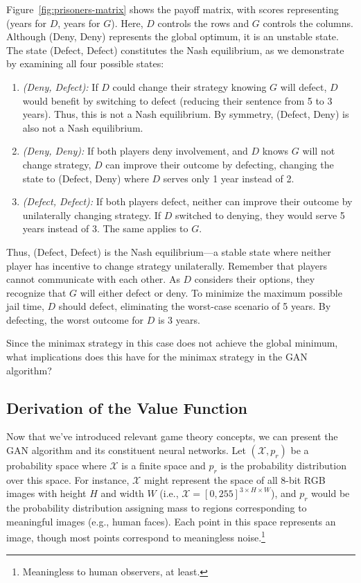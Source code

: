 Figure~\ref{fig:prisoners-matrix} shows the payoff matrix, with scores representing (years for $D$, years for $G$). Here, $D$ controls the rows and $G$ controls the columns. Although (Deny, Deny) represents the global optimum, it is an unstable state. The state (Defect, Defect) constitutes the Nash equilibrium, as we demonstrate by examining all four possible states:

\begin{enumerate}
	\item \textit{(Deny, Defect):} If $D$ could change their strategy knowing $G$ will defect, $D$ would benefit by switching to defect (reducing their sentence from 5 to 3 years). Thus, this is not a Nash equilibrium. By symmetry, (Defect, Deny) is also not a Nash equilibrium.

	\item \textit{(Deny, Deny):} If both players deny involvement, and $D$ knows $G$ will not change strategy, $D$ can improve their outcome by defecting, changing the state to (Defect, Deny) where $D$ serves only 1 year instead of 2.

	\item \textit{(Defect, Defect):} If both players defect, neither can improve their outcome by unilaterally changing strategy. If $D$ switched to denying, they would serve 5 years instead of 3. The same applies to $G$.
\end{enumerate}

Thus, (Defect, Defect) is the Nash equilibrium—a stable state where neither player has incentive to change strategy unilaterally. Remember that players cannot communicate with each other. As $D$ considers their options, they recognize that $G$ will either defect or deny. To minimize the maximum possible jail time, $D$ should defect, eliminating the worst-case scenario of 5 years. By defecting, the worst outcome for $D$ is 3 years.

Since the minimax strategy in this case does not achieve the global minimum, what implications does this have for the minimax strategy in the GAN algorithm?

\subsection{Derivation of the Value Function}%
\label{sec:derivation}

Now that we've introduced relevant game theory concepts, we can present the GAN algorithm and its constituent neural networks. Let $(\mathcal{X}, p_r)$ be a probability space where $\mathcal{X}$ is a finite space and $p_r$ is the probability distribution over this space. For instance, $\mathcal{X}$ might represent the space of all 8-bit RGB images with height $H$ and width $W$ (i.e., $\mathcal{X} = [0, 255]^{3 \times H \times W}$), and $p_r$ would be the probability distribution assigning mass to regions corresponding to meaningful images (e.g., human faces). Each point in this space represents an image, though most points correspond to meaningless noise.\footnote{Meaningless to human observers, at least.}

